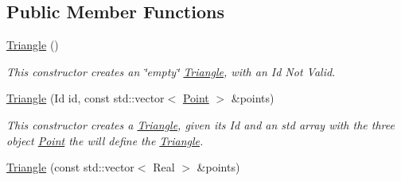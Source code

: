 \subsection*{Public Member Functions}
\begin{DoxyCompactItemize}
\item 
\hypertarget{classTriangle_a1f52e8639c742a110d65ea909c408f48}{
\hyperlink{classTriangle_a1f52e8639c742a110d65ea909c408f48}{Triangle} ()}
\label{classTriangle_a1f52e8639c742a110d65ea909c408f48}

\begin{DoxyCompactList}\small\item\em This constructor creates an \char`\"{}empty\char`\"{} \hyperlink{classTriangle}{Triangle}, with an Id Not Valid. \item\end{DoxyCompactList}\item 
\hypertarget{classTriangle_a97691f5a22b40e10a8e8f49474e467be}{
\hyperlink{classTriangle_a97691f5a22b40e10a8e8f49474e467be}{Triangle} (Id id, const std::vector$<$ \hyperlink{classPoint}{Point} $>$ \&points)}
\label{classTriangle_a97691f5a22b40e10a8e8f49474e467be}

\begin{DoxyCompactList}\small\item\em This constructor creates a \hyperlink{classTriangle}{Triangle}, given its Id and an std array with the three object \hyperlink{classPoint}{Point} the will define the \hyperlink{classTriangle}{Triangle}. \item\end{DoxyCompactList}\item 
\hypertarget{classTriangle_a3be310ba8e6304749d998d0ca304752c}{
\hyperlink{classTriangle_a3be310ba8e6304749d998d0ca304752c}{Triangle} (const std::vector$<$ Real $>$ \&points)}
\label{classTriangle_a3be310ba8e6304749d998d0ca304752c}


\end{DoxyCompactItemize}
